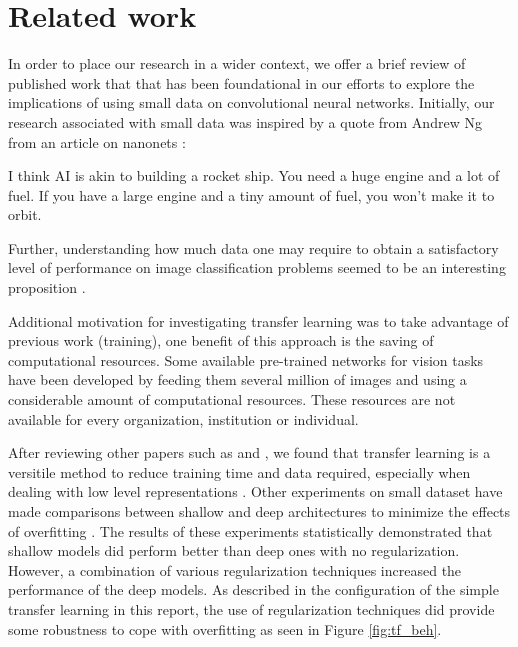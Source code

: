 \documentclass{article}
\begin{document}
\section{Related work}
\label{sec:related}

In order to place our research in a wider context, we offer a brief review of published work that that has been foundational in our efforts to explore the implications of using small data on convolutional neural networks. Initially, our research associated with small data was inspired by a quote from Andrew Ng from an article on nanonets \cite{nanoNets}:

\begin{displayquote}
I think AI is akin to building a rocket ship. You need a huge engine and a lot of fuel. If you have a large engine and a tiny amount of fuel, you won’t make it to orbit.
\end{displayquote}

Further, understanding how much data one may require to obtain a satisfactory level of performance on image classification problems seemed to be an interesting proposition \cite{howMuchData}. 

Additional motivation for investigating transfer learning was to take advantage of previous work (training), one benefit of this approach is the saving of computational resources. Some available pre-trained networks for vision tasks have been developed by feeding them several million of images and using a considerable amount of computational resources. These resources are not available for every organization, institution or individual.

After reviewing other papers such as \cite{NIPS2014_5347} and \cite{oquab2014learning}, we found that transfer learning is a versitile method to reduce training time and data required, especially when dealing with low level representations \cite{NIPS2014_5347}. Other experiments on small dataset have made comparisons between shallow and deep architectures to minimize the effects of overfitting \citep{pasupa2016comparison}. The results of these experiments statistically demonstrated that shallow models did perform better than deep ones with no regularization. However, a combination of various regularization techniques increased the performance of the deep models. As described in the configuration of the simple transfer learning in this report, the use of regularization techniques did provide some robustness to cope with overfitting as seen in Figure \ref{fig:tf_beh}.
\end{document}
